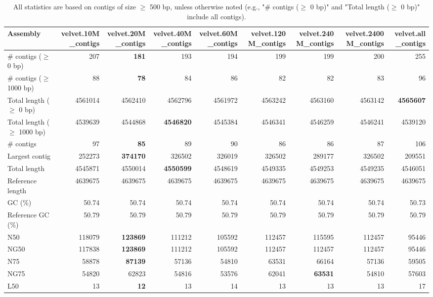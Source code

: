 \documentclass[12pt,a4paper]{article}
\begin{document}
\begin{table}[ht]
\begin{center}
\caption{All statistics are based on contigs of size $\geq$ 500 bp, unless otherwise noted (e.g., "\# contigs ($\geq$ 0 bp)" and "Total length ($\geq$ 0 bp)" include all contigs).}
\begin{tabular}{|l*{8}{|r}|}
\hline
Assembly & velvet.10M\_contigs & velvet.20M\_contigs & velvet.40M\_contigs & velvet.60M\_contigs & velvet.120M\_contigs & velvet.240M\_contigs & velvet.2400M\_contigs & velvet.all\_contigs \\ \hline
\# contigs ($\geq$ 0 bp) & 207 & {\bf 181} & 193 & 194 & 199 & 199 & 200 & 255 \\ \hline
\# contigs ($\geq$ 1000 bp) & 88 & {\bf 78} & 84 & 86 & 82 & 82 & 83 & 96 \\ \hline
Total length ($\geq$ 0 bp) & 4561014 & 4562410 & 4562796 & 4561972 & 4563242 & 4563160 & 4563142 & {\bf 4565607} \\ \hline
Total length ($\geq$ 1000 bp) & 4539639 & 4544868 & {\bf 4546820} & 4545384 & 4546341 & 4546259 & 4546241 & 4539120 \\ \hline
\# contigs & 97 & {\bf 85} & 89 & 90 & 86 & 86 & 87 & 106 \\ \hline
Largest contig & 252273 & {\bf 374170} & 326502 & 326019 & 326502 & 289177 & 326502 & 209551 \\ \hline
Total length & 4545871 & 4550014 & {\bf 4550599} & 4548619 & 4549335 & 4549253 & 4549235 & 4546051 \\ \hline
Reference length & 4639675 & 4639675 & 4639675 & 4639675 & 4639675 & 4639675 & 4639675 & 4639675 \\ \hline
GC (\%) & 50.74 & 50.74 & 50.74 & 50.74 & 50.74 & 50.74 & 50.74 & 50.73 \\ \hline
Reference GC (\%) & 50.79 & 50.79 & 50.79 & 50.79 & 50.79 & 50.79 & 50.79 & 50.79 \\ \hline
N50 & 118079 & {\bf 123869} & 111212 & 105592 & 112457 & 115595 & 112457 & 95446 \\ \hline
NG50 & 117838 & {\bf 123869} & 111212 & 105592 & 112457 & 112457 & 112457 & 95446 \\ \hline
N75 & 58878 & {\bf 87139} & 57136 & 54810 & 63531 & 66164 & 57136 & 59505 \\ \hline
NG75 & 54820 & 62823 & 54816 & 53576 & 62041 & {\bf 63531} & 54810 & 57603 \\ \hline
L50 & 13 & {\bf 12} & 13 & 14 & 13 & 13 & 13 & 17 \\ \hline

\end{tabular}
\end{center}
\end{table}
\end{document}
